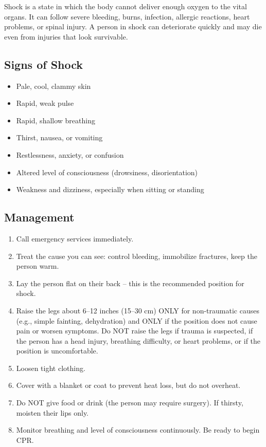Shock is a state in which the body cannot deliver enough oxygen to the vital organs. It can follow severe bleeding, burns, infection, allergic reactions, heart problems, or spinal injury. A person in shock can deteriorate quickly and may die even from injuries that look survivable.

\subsection{Signs of Shock}

\begin{itemize}[leftmargin=*]
\item Pale, cool, clammy skin
\item Rapid, weak pulse
\item Rapid, shallow breathing
\item Thirst, nausea, or vomiting
\item Restlessness, anxiety, or confusion
\item Altered level of consciousness (drowsiness, disorientation)
\item Weakness and dizziness, especially when sitting or standing
\end{itemize}

\subsection{Management}

\begin{enumerate}[leftmargin=*]
\item Call emergency services immediately.
\item Treat the cause you can see: control bleeding, immobilize fractures, keep the person warm.
\item Lay the person flat on their back -- this is the recommended position for shock.
\item Raise the legs about 6--12 inches (15--30 cm) ONLY for non-traumatic causes (e.g., simple fainting, dehydration) and ONLY if the position does not cause pain or worsen symptoms. Do NOT raise the legs if trauma is suspected, if the person has a head injury, breathing difficulty, or heart problems, or if the position is uncomfortable.
\item Loosen tight clothing.
\item Cover with a blanket or coat to prevent heat loss, but do not overheat.
\item Do NOT give food or drink (the person may require surgery). If thirsty, moisten their lips only.
\item Monitor breathing and level of consciousness continuously. Be ready to begin CPR.
\end{enumerate}

